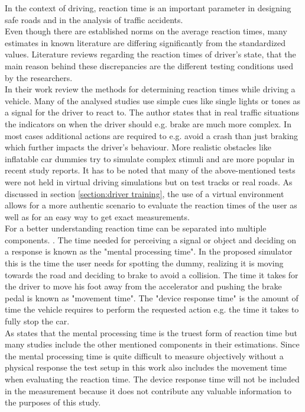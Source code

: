 In the context of driving, reaction time is an important parameter in designing safe roads \autocite[195]{green2000long} and in the analysis of traffic accidents. \autocite[]{jurecki2011test}
\\
Even though there are established norms on the average reaction times, many estimates in known literature are differing significantly from the standardized values. \autocite[]{green2000long} 
Literature reviews regarding the reaction times of driver’s state, that the main reason behind these discrepancies are the different testing conditions used by the researchers. \autocite[]{green2000long} \autocite[]{jurecki2011test}
\\
In their work \textcite[]{jurecki2011test} review the methods for determining reaction times while driving a vehicle.
Many of the analysed studies use simple cues like single lights or tones as a signal for the driver to react to.
The author states that in real traffic situations the indicators on when the driver should e.g. brake are much more complex.
In most cases additional actions are required to e.g. avoid a crash than just braking which further impacts the driver’s behaviour.
More realistic obstacles like inflatable car dummies \autocite[203]{jansson2002decision} try to simulate complex stimuli and are more popular in recent study reports. \autocite[17]{jurecki2011test}
It has to be noted that many of the above-mentioned tests were not held in virtual driving simulations but on test tracks or real roads.
As discussed in section \ref{section:driver training}, the use of a virtual environment allows for a more authentic scenario to evaluate the reaction times of the user as well as for an easy way to get exact measurements.
\\
For a better understanding reaction time can be separated into multiple components. \autocite[]{boff1988engineering}.
The time needed for perceiving a signal or object and deciding on a response is known as the "mental processing time".
In the proposed simulator this is the time the user needs for spotting the dummy, realizing it is moving towards the road and deciding to brake to avoid a collision.
The time it takes for the driver to move his foot away from the accelerator and pushing the brake pedal is known as "movement time".
The "device response time" is the amount of time the vehicle requires to perform the requested action e.g. the time it takes to fully stop the car.
\\
As \textcite[200]{green2000long} states that the mental processing time is the truest form of reaction time but many studies include the other mentioned components in their estimations.
Since the mental processing time is quite difficult to measure objectively without a physical response the test setup in this work also includes the movement time when evaluating the reaction time.
The device response time will not be included in the measurement because it does not contribute any valuable information to the purposes of this study.


